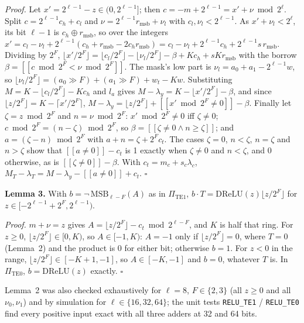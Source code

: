 \emph{Proof.} Let $x' = 2^{\ell-1} - z \in (0, 2^{\ell-1}]$; then $c = -m + 2^{\ell-1} = x' + \nu \bmod 2^\ell$. Split
$c = 2^{\ell-1} c_h + c_l$ and $\nu = 2^{\ell-1} r_{\mathrm{msb}} + \nu_l$ with $c_l, \nu_l < 2^{\ell-1}$. As
$x' + \nu_l < 2^\ell$, its bit $\ell - 1$ is $c_h \oplus r_{\mathrm{msb}}$, so over the integers
$x' = c_l - \nu_l + 2^{\ell-1} (c_h + r_{\mathrm{msb}} - 2 c_h r_{\mathrm{msb}}) = c_l - \nu_l + 2^{\ell-1} c_h + 2^{\ell-1} s\,r_{\mathrm{msb}}$.
Dividing by $2^F$, $\lfloor x'/2^F \rfloor = \lfloor c_l/2^F \rfloor - \lfloor \nu_l/2^F \rfloor - \beta + K c_h + s K r_{\mathrm{msb}}$
with the borrow $\beta = [\![c \bmod 2^F < \nu \bmod 2^F]\!]$. The mask's low part is
$\nu_l = a_0 + a_1 - 2^{\ell-1} w$, so $\lfloor \nu_l / 2^F \rfloor = (a_0 \gg F) + (a_1 \gg F) + w_t - K w$. Substituting
$M = K - \lfloor c_l/2^F \rfloor - K c_h$ and $l_a$ gives $M - \lambda_y = K - \lfloor x'/2^F \rfloor - \beta$, and since
$\lfloor z / 2^F \rfloor = K - \lceil x'/2^F \rceil$,
$M - \lambda_y = \lfloor z / 2^F \rfloor + [\![x' \bmod 2^F \neq 0]\!] - \beta$. Finally let $\zeta = z \bmod 2^F$ and
$n = \nu \bmod 2^F$: $x' \bmod 2^F \neq 0$ iff $\zeta \neq 0$; $c \bmod 2^F = (n - \zeta) \bmod 2^F$, so
$\beta = [\![\zeta \neq 0 \wedge n \geq \zeta]\!]$; and $a = (\zeta - n) \bmod 2^F$ with $a + n = \zeta + 2^F c_t$. The
cases $\zeta = 0$, $n < \zeta$, $n = \zeta$ and $n > \zeta$ show that $[\![a \neq 0]\!] - c_t$ is 1 exactly when
$\zeta \neq 0$ and $n < \zeta$, and 0 otherwise, as is $[\![\zeta \neq 0]\!] - \beta$. With $c_t = m_c + s_c \lambda_c$, $M_T - \lambda_T = M - \lambda_y - [\![a \neq 0]\!] + c_t$.
\hfill$\square$

\textbf{Lemma 3.} With $b = \neg\,\mathrm{MSB}_{\ell-F}(A)$ as in $\Pi_{\mathrm{TE1}}$,
$b \cdot T = \mathrm{DReLU}(z) \lfloor z / 2^F \rfloor$ for $z \in [-2^{\ell-1} + 2^F, 2^{\ell-1})$.

\emph{Proof.} $m + \nu = z$ gives $A = \lfloor z / 2^F \rfloor - c_t \bmod 2^{\ell-F}$, and $K$ is half that ring. For
$z \geq 0$, $\lfloor z/2^F \rfloor \in [0, K)$, so $A \in [-1, K)$: $A = -1$ only if $\lfloor z/2^F \rfloor = 0$, where
$T = 0$ (Lemma~2) and the product is 0 for either bit; otherwise $b = 1$. For $z < 0$ in the range,
$\lfloor z/2^F \rfloor \in [-K + 1, -1]$, so $A \in [-K, -1]$ and $b = 0$, whatever $T$ is. In $\Pi_{\mathrm{TE0}}$,
$b = \mathrm{DReLU}(z)$ exactly. \hfill$\square$

Lemma~2 was also checked exhaustively for $\ell = 8$, $F \in \{2, 3\}$ (all $z \ge 0$ and all $\nu_0, \nu_1$) and by
simulation for $\ell \in \{16, 32, 64\}$; the unit tests \texttt{RELU\_TE1} / \texttt{RELU\_TE0} find every positive
input exact with all three adders at 32 and 64 bits.

